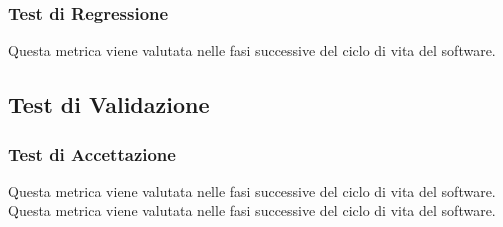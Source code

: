		\subsubsection{Test di Regressione}
			Questa metrica viene valutata nelle fasi successive del ciclo di vita del software.
		
	
	
	\subsection{Test di Validazione}
		\subsubsection{Test di Accettazione}	
				Questa metrica viene valutata nelle fasi successive del ciclo di vita del software.
				Questa metrica viene valutata nelle fasi successive del ciclo di vita del software.